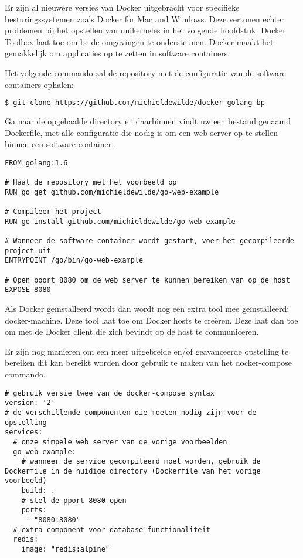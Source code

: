 Er zijn al nieuwere versies van Docker uitgebracht voor specifieke besturingssystemen zoals Docker for Mac and Windows. Deze vertonen echter problemen bij het opstellen van unikerneles in het volgende hoofdstuk. Docker Toolbox laat toe om beide omgevingen te ondersteunen. Docker maakt het gemakkelijk om applicaties op te zetten in software containers.

\noindent Het volgende commando zal de repository met de configuratie van de software containers ophalen:
\begin{lstlisting}[language=bash]
  $ git clone https://github.com/michieldewilde/docker-golang-bp
\end{lstlisting}

Ga naar de opgehaalde directory en daarbinnen vindt uw een bestand genaamd Dockerfile, met alle configuratie die nodig is om een web server op te stellen binnen een software container.

\begin{lstlisting}[language=docker,caption={Dockerfile},breaklines=true,label={code:docker}]
FROM golang:1.6

# Haal de repository met het voorbeeld op
RUN go get github.com/michieldewilde/go-web-example

# Compileer het project
RUN go install github.com/michieldewilde/go-web-example

# Wanneer de software container wordt gestart, voer het gecompileerde project uit
ENTRYPOINT /go/bin/go-web-example

# Open poort 8080 om de web server te kunnen bereiken van op de host
EXPOSE 8080
\end{lstlisting}

Als Docker geïnstalleerd wordt dan wordt nog een extra tool mee geïnstalleerd: docker-machine. Deze tool laat toe om Docker hosts te creëren. Deze laat dan toe om met de Docker client die zich bevindt op de host te communiceren. 

Er zijn nog manieren om een meer uitgebreide en/of geavanceerde opstelling te bereiken dit kan bereikt worden door gebruik te maken van het docker-compose commando.

\begin{lstlisting}[language=docker-compose,caption={docker-compose.yaml},breaklines=true,label={code:docker-compose}]
# gebruik versie twee van de docker-compose syntax
version: '2'
# de verschillende componenten die moeten nodig zijn voor de opstelling
services:
  # onze simpele web server van de vorige voorbeelden
  go-web-example:
    # wanneer de service gecompileerd moet worden, gebruik de Dockerfile in de huidige directory (Dockerfile van het vorige voorbeeld)
    build: .
    # stel de pport 8080 open
    ports:
     - "8080:8080"
  # extra component voor database functionaliteit
  redis:
    image: "redis:alpine"
\end{lstlisting}

